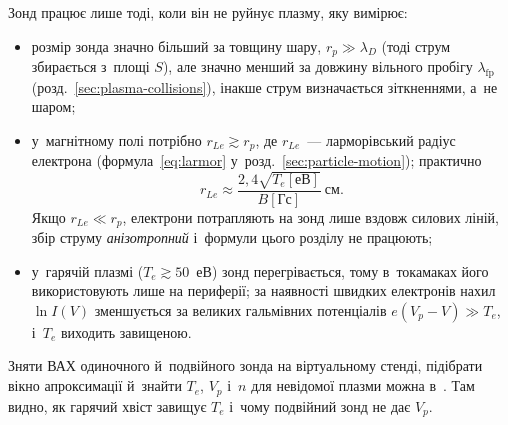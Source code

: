 Зонд працює лише тоді, коли він не руйнує плазму, яку вимірює:
\begin{itemize}
	\item розмір зонда значно більший за товщину шару, $r_p\gg\lambda_D$ (тоді струм збирається з~площі $S$),
	але значно менший за довжину вільного пробігу $\lambda_{\mathrm{fp}}$
	(розд.~\ref{sec:plasma-collisions}), інакше струм визначається зіткненнями, а~не шаром;
	\item у~магнітному полі потрібно $r_{Le}\gtrsim r_p$, де $r_{Le}$~--- ларморівський радіус
	електрона (формула~\eqref{eq:larmor} у~розд.~\ref{sec:particle-motion}); практично
	\[ r_{Le}\approx\frac{2{,}4\sqrt{T_e[\text{еВ}]}}{B[\text{Гс}]}\ \text{см}. \]
	Якщо $r_{Le}\ll r_p$, електрони потрапляють на зонд лише вздовж силових ліній, збір струму
	\emph{анізотропний} і~формули цього розділу не працюють;
	\item у~гарячій плазмі ($T_e\gtrsim50$~еВ) зонд перегрівається, тому в~токамаках його використовують лише на периферії;
	за наявності швидких електронів нахил $\ln I(V)$ зменшується за великих гальмівних потенціалів $e(V_p-V)\gg T_e$, і~$T_e$ виходить завищеною.
\end{itemize}

\begin{Simulation}
Зняти ВАХ одиночного й~подвійного зонда на віртуальному стенді, підібрати вікно апроксимації й~знайти $T_e$, $V_p$ і~$n$ для невідомої плазми можна в~. Там видно, як гарячий хвіст завищує $T_e$ і~чому подвійний зонд не дає $V_p$.
\end{Simulation}



